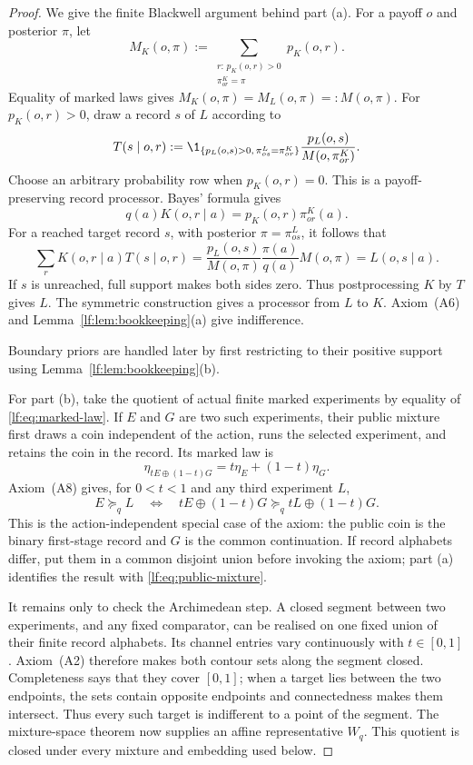 \begin{proof}
We give the finite Blackwell argument behind part \textup{(a)}.  For a payoff
$o$ and posterior $\pi$, let
\[
M_K(o,\pi):=
\sum_{\substack{r:\,p_K(o,r)>0\\ \pi^K_{or}=\pi}} p_K(o,r).
\]
Equality of marked laws gives $M_K(o,\pi)=M_L(o,\pi)=:M(o,\pi)$.
For $p_K(o,r)>0$, draw a record $s$ of $L$ according to
\begin{equation}
T(s\mid o,r):=
\1_{\{p_L(o,s)>0,\,\pi^L_{os}=\pi^K_{or}\}}
\frac{p_L(o,s)}{M(o,\pi^K_{or})}.
\label{lf:eq:matching-processor}
\end{equation}
Choose an arbitrary probability row when $p_K(o,r)=0$.  This is a
payoff-preserving record processor.  Bayes' formula gives
\[
q(a)K(o,r\mid a)=p_K(o,r)\pi^K_{or}(a).
\]
For a reached target record $s$, with posterior $\pi=\pi^L_{os}$, it follows
that
\[
\sum_r K(o,r\mid a)T(s\mid o,r)
=\frac{p_L(o,s)}{M(o,\pi)}
  \frac{\pi(a)}{q(a)}M(o,\pi)
=L(o,s\mid a).
\]
If $s$ is unreached, full support makes both sides zero.  Thus postprocessing
$K$ by $T$ gives $L$.  The symmetric construction gives a
processor from $L$ to $K$.  Axiom~\textup{(A6)} and
Lemma~\ref{lf:lem:bookkeeping}\textup{(a)} give indifference.

Boundary priors are handled later by first restricting to their positive
support using Lemma~\ref{lf:lem:bookkeeping}\textup{(b)}.

For part \textup{(b)}, take the quotient of actual finite marked experiments by
equality of \eqref{lf:eq:marked-law}.  If $E$ and $G$ are two such experiments,
their public mixture first draws a coin independent of the action, runs the
selected experiment, and retains the coin in the record.  Its marked law is
\begin{equation}
\eta_{tE\oplus(1-t)G}=t\eta_E+(1-t)\eta_G.
\label{lf:eq:public-mixture}
\end{equation}
Axiom~\textup{(A8)} gives, for $0<t<1$ and any third experiment $L$,
\begin{equation}
E\succeq_q L
\quad\Longleftrightarrow\quad
tE\oplus(1-t)G\succeq_q tL\oplus(1-t)G.
\label{lf:eq:mixture-independence}
\end{equation}
This is the action-independent special case of the axiom: the public coin is the binary first-stage record and
$G$ is the common continuation.  If record alphabets differ, put them in a common disjoint union before invoking
the axiom; part \textup{(a)} identifies the result with
\eqref{lf:eq:public-mixture}.

It remains only to check the Archimedean step.  A closed segment between two
experiments, and any fixed comparator, can be realised on one fixed union of
their finite record alphabets.  Its channel entries vary continuously with
$t\in[0,1]$.
Axiom~\textup{(A2)} therefore makes both contour sets along the segment closed.
Completeness says that they cover $[0,1]$; when a target lies between the two
endpoints, the sets contain opposite endpoints and connectedness makes them
intersect.  Thus every such target is indifferent to a point of the segment.
The mixture-space theorem now supplies an affine representative $W_q$.  This
quotient is closed under every mixture and embedding used below.
\end{proof}

